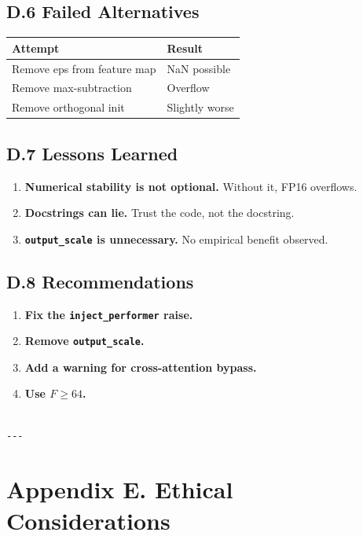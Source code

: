 \subsection{D.6 Failed Alternatives}

\begin{table}[H]
\centering
\small
\begin{tabular}{ll}
\toprule
\textbf{Attempt} & \textbf{Result} \\
\midrule
Remove eps from feature map & NaN possible \\
Remove max-subtraction & Overflow \\
Remove orthogonal init & Slightly worse \\
\bottomrule
\end{tabular}
\end{table}

\subsection{D.7 Lessons Learned}

\begin{enumerate}
\item \textbf{Numerical stability is not optional.} Without it, FP16 overflows.
\item \textbf{Docstrings can lie.} Trust the code, not the docstring.
\item \textbf{\texttt{output\_scale} is unnecessary.} No empirical benefit observed.

\end{enumerate}
\subsection{D.8 Recommendations}

\begin{enumerate}
\item \textbf{Fix the \texttt{inject\_performer} raise.}
\item \textbf{Remove \texttt{output\_scale}.}
\item \textbf{Add a warning for cross-attention bypass.}
\item \textbf{Use $F \geq 64$.}
\end{enumerate}
\begin{lstlisting}

---
\end{lstlisting}


\section{Appendix E. Ethical Considerations}

